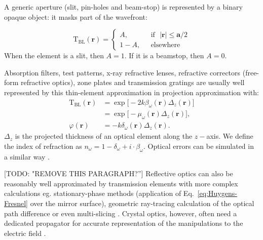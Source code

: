 \documentclass{iucr}              %
\newcommand{\todo}[1]{{\color{red}[TODO: "#1'']}}
\begin{document}
 

A generic aperture (slit, pin-holes and beam-stop) is represented by a binary opaque object: it masks part of the wavefront:

\begin{equation}
\mathrm{T}_{\text{BL}}(\textbf{r}) =
\left\{
\begin{matrix}
A,  & \mbox{~~if~~}  |\textbf{r}| \le \textbf{a}/2
\\ 
1 - A, & \mbox{~~elsewhere}
\end{matrix}
\right.
\end{equation}
When the element is a slit, then $A=1$. If it is a beamstop, then $A=0$. 


Absorption filters, test patterns, x-ray refractive lenses, refractive correctors (free-form refractive optics), zone plates and transmission gratings are usually well represented by this thin-element approximation in projection approximation with:
\begin{subequations}
\begin{align}   
    \mathrm{T}_{\text{BL}}(\textbf{r})&=\exp{\big[-2k\beta_\omega(\textbf{r})\Delta_z(\textbf{r})\big]}\label{eq:aux_funcs_transa}  \\
    &=\exp{\big[-\mu_\omega(\textbf{r})\Delta_z(\textbf{r})\big]},\nonumber\\
    \varphi(\textbf{r})&=-k\delta_\omega(\textbf{r})\Delta_z(\textbf{r}).\label{eq:aux_funcs_transb}
\end{align}
\end{subequations}
$\Delta_z$ is the projected thickness of an optical element along the $z-$axis. We define the index of refraction as $n_\omega=1-\delta_\omega+i\cdot\beta_\omega$. Optical errors can be simulated in a similar way \cite{Laundy2014,Celestre:mo5214,srioLBL}.

\todo{REMOVE THIS PARAGRAPH?} Reflective optics can also be reasonably well approximated by transmission elements with more complex calculations eg. stationary-phase methods (application of Eq.~\ref{eq:Huygens-Fresnel} over the mirror surface), geometric ray-tracing calculation of the optical path difference \cite{Canestrari2014} or even multi-slicing \cite{Li2017}. Crystal optics, however, often need a dedicated propagator for accurate representation of the manipulations to the electric field \cite{Sutter2014, Sutter2020}.  

\end{document}
